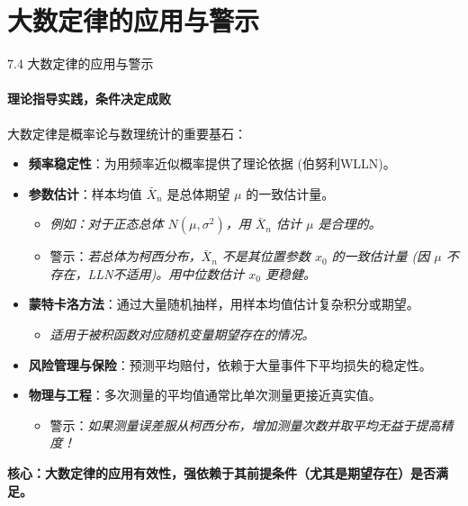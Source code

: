 \documentclass[UTF8]{beamer}
\begin{document}
\section{大数定律的应用与警示}
\begin{frame}[shrink=5]{7.4 大数定律的应用与警示}
    \framesubtitle{理论指导实践，条件决定成败}
    大数定律是概率论与数理统计的重要基石：
    \begin{itemize}
        \item \textbf{频率稳定性}：为用频率近似概率提供了理论依据 (伯努利WLLN)。
        \item \textbf{参数估计}：样本均值 $\bar{X}_n$ 是总体期望 $\mu$ 的\alert{一致估计量}。
            \begin{itemize}
                \item \textit{例如：对于正态总体 $N(\mu, \sigma^2)$，用 $\bar{X}_n$ 估计 $\mu$ 是合理的。}
                \item \alert{警示}：\textit{若总体为柯西分布，$\bar{X}_n$ 不是其位置参数 $x_0$ 的一致估计量 (因 $\mu$ 不存在，LLN不适用)。用中位数估计 $x_0$ 更稳健。}
            \end{itemize}
        \item \textbf{蒙特卡洛方法}：通过大量随机抽样，用样本均值估计复杂积分或期望。
            \begin{itemize}
                \item \textit{适用于被积函数对应随机变量期望存在的情况。}
            \end{itemize}
        \item \textbf{风险管理与保险}：预测平均赔付，依赖于大量事件下平均损失的稳定性。
        \item \textbf{物理与工程}：多次测量的平均值通常比单次测量更接近真实值。
            \begin{itemize}
                \item \alert{警示}：\textit{如果测量误差服从柯西分布，增加测量次数并取平均\alert{无益于}提高精度！}
            \end{itemize}
    \end{itemize}
    \textbf{核心：大数定律的应用有效性，强依赖于其\alert{前提条件}（尤其是期望存在）是否满足。}
\end{frame}
\end{document}
